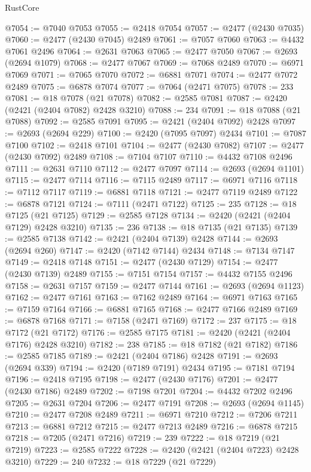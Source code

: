 \begin{lexlean}{RustCore}
\begin{coremodule}
@7054 := @7040 @7053
@7055 := @2418 @7054
@7057 := @2477 (@2430 @7035)
@7060 := @2477 (@2430 @7045) @2489
@7061 := @7057 @7060
@7063 := @4432 @7061 @2496
@7064 := @2631 @7063
@7065 := @2477 @7050
@7067 := @2693 (@2694 @1079)
@7068 := @2477 @7067
@7069 := @7068 @2489
@7070 := @6971 @7069
@7071 := @7065 @7070
@7072 := @6881 @7071
@7074 := @2477 @7072 @2489
@7075 := @6878 @7074
@7077 := @7064 (@2471 @7075)
@7078 := 233
@7081 := @18 @7078 (@21 @7078)
@7082 := @2585 @7081
@7087 := @2420 (@2421 (@2404 @7082) @2428 @3210)
@7088 := 234
@7091 := @18 @7088 (@21 @7088)
@7092 := @2585 @7091
@7095 := @2421 (@2404 @7092) @2428
@7097 := @2693 (@2694 @229)
@7100 := @2420 (@7095 @7097) @2434
@7101 := @7087 @7100
@7102 := @2418 @7101
@7104 := @2477 (@2430 @7082)
@7107 := @2477 (@2430 @7092) @2489
@7108 := @7104 @7107
@7110 := @4432 @7108 @2496
@7111 := @2631 @7110
@7112 := @2477 @7097
@7114 := @2693 (@2694 @1101)
@7115 := @2477 @7114
@7116 := @7115 @2489
@7117 := @6971 @7116
@7118 := @7112 @7117
@7119 := @6881 @7118
@7121 := @2477 @7119 @2489
@7122 := @6878 @7121
@7124 := @7111 (@2471 @7122)
@7125 := 235
@7128 := @18 @7125 (@21 @7125)
@7129 := @2585 @7128
@7134 := @2420 (@2421 (@2404 @7129) @2428 @3210)
@7135 := 236
@7138 := @18 @7135 (@21 @7135)
@7139 := @2585 @7138
@7142 := @2421 (@2404 @7139) @2428
@7144 := @2693 (@2694 @260)
@7147 := @2420 (@7142 @7144) @2434
@7148 := @7134 @7147
@7149 := @2418 @7148
@7151 := @2477 (@2430 @7129)
@7154 := @2477 (@2430 @7139) @2489
@7155 := @7151 @7154
@7157 := @4432 @7155 @2496
@7158 := @2631 @7157
@7159 := @2477 @7144
@7161 := @2693 (@2694 @1123)
@7162 := @2477 @7161
@7163 := @7162 @2489
@7164 := @6971 @7163
@7165 := @7159 @7164
@7166 := @6881 @7165
@7168 := @2477 @7166 @2489
@7169 := @6878 @7168
@7171 := @7158 (@2471 @7169)
@7172 := 237
@7175 := @18 @7172 (@21 @7172)
@7176 := @2585 @7175
@7181 := @2420 (@2421 (@2404 @7176) @2428 @3210)
@7182 := 238
@7185 := @18 @7182 (@21 @7182)
@7186 := @2585 @7185
@7189 := @2421 (@2404 @7186) @2428
@7191 := @2693 (@2694 @339)
@7194 := @2420 (@7189 @7191) @2434
@7195 := @7181 @7194
@7196 := @2418 @7195
@7198 := @2477 (@2430 @7176)
@7201 := @2477 (@2430 @7186) @2489
@7202 := @7198 @7201
@7204 := @4432 @7202 @2496
@7205 := @2631 @7204
@7206 := @2477 @7191
@7208 := @2693 (@2694 @1145)
@7210 := @2477 @7208 @2489
@7211 := @6971 @7210
@7212 := @7206 @7211
@7213 := @6881 @7212
@7215 := @2477 @7213 @2489
@7216 := @6878 @7215
@7218 := @7205 (@2471 @7216)
@7219 := 239
@7222 := @18 @7219 (@21 @7219)
@7223 := @2585 @7222
@7228 := @2420 (@2421 (@2404 @7223) @2428 @3210)
@7229 := 240
@7232 := @18 @7229 (@21 @7229)

\end{coremodule}
\end{lexlean}
